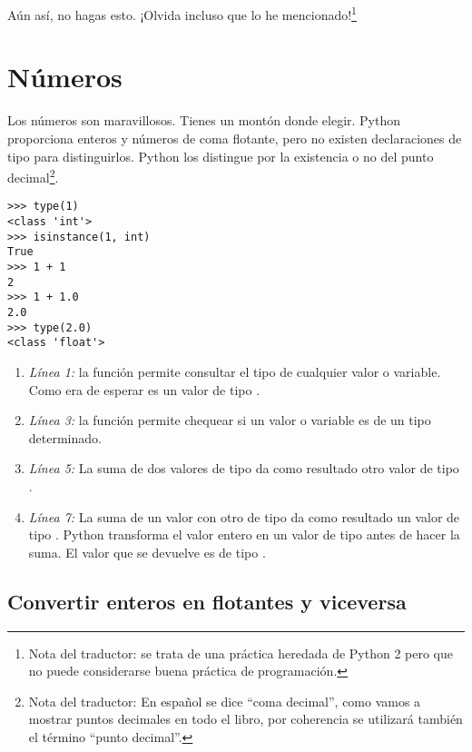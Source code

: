 Aún así, no hagas esto. ¡Olvida incluso que lo he mencionado!\footnote{Nota del traductor: se trata de una práctica heredada de Python 2 pero que no puede considerarse buena práctica de programación.}

\section{Números}

Los números son maravillosos. Tienes un montón donde elegir. Python proporciona enteros y números de coma flotante, pero no existen declaraciones de tipo para distinguirlos. Python los distingue por la existencia o no del punto decimal\footnote{Nota del traductor: En español se dice ``coma decimal'', como vamos a mostrar puntos decimales en todo el libro, por coherencia se utilizará también el término ``punto decimal''.}.

\noindent\begin{minipage}{\textwidth}
\begin{lstlisting}[mathescape=True]
>>> type(1)
<class 'int'>
>>> isinstance(1, int)
True
>>> 1 + 1
2
>>> 1 + 1.0
2.0
>>> type(2.0)
<class 'float'>
\end{lstlisting}
\end{minipage}

\begin{enumerate}

\item \emph{Línea 1:} la función  permite consultar el tipo de cualquier valor o variable. Como era de esperar  es un valor de tipo .

\item \emph{Línea 3:} la función  permite chequear si un valor o variable es de un tipo determinado.

\item \emph{Línea 5:} La suma de dos valores de tipo  da como resultado otro valor de tipo .

\item \emph{Línea 7:} La suma de un valor  con otro de tipo  da como resultado un valor de tipo . Python transforma el valor entero en un valor de tipo  antes de hacer la suma. El valor que se devuelve es de tipo .

\end{enumerate}

\subsection{Convertir enteros en flotantes y viceversa}


